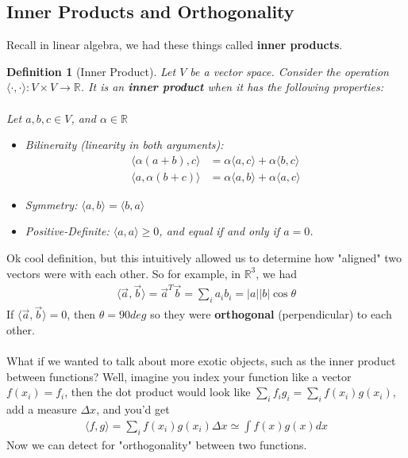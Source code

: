 \documentclass[12pt,fleqn]{article}
\numberwithin{equation}{section} %
\newtheorem{definition}{Definition}
\begin{document}
\subsection{Inner Products and Orthogonality}
Recall in linear algebra, we had these things called \textbf{inner products}. 
\begin{definition}
	[Inner Product] Let $V$ be a vector space. Consider the operation $\langle \cdot, \cdot \rangle : V \times V \to \mathbb R$. It is an \textbf{inner product} when it has the following properties:
	\\
	\\
	Let $a,b,c \in V$, and $\alpha \in \mathbb R$
	\begin{itemize}
		\item Bilineraity (linearity in both arguments): 
		\begin{align}
			\langle \alpha (a + b) , c\rangle & = \alpha \langle a, c\rangle  + \alpha \langle b , c\rangle\\
			\langle a, \alpha (b + c)\rangle &  = \alpha \langle a, b\rangle + \alpha \langle a, c\rangle
		\end{align}  
		\item Symmetry: $\langle a, b\rangle = \langle b, a\rangle$
		\item Positive-Definite: $\langle a, a\rangle \geq 0$, and equal if and only if $a=0$.
	\end{itemize}
\end{definition}
Ok cool definition, but this intuitively allowed us to determine how "aligned" two vectors were with each other. So for example, in $\mathbb R^3$, we had
\begin{align}
	\langle \vec a, \vec b\rangle = \vec a^T \vec b =  \sum_i a_i b_i =|a||b| \cos \theta
\end{align}
If $\langle \vec a , \vec b\rangle = 0$, then $\theta = 90 deg$ so they were \textbf{orthogonal} (perpendicular) to each other.\\
\\
What if we wanted to talk about more exotic objects, such as the inner product between functions? Well, imagine you index your function like a vector $f(x_i) = f_i$, then the dot product would look like $\sum_i f_i g_i = \sum_i f(x_i ) g(x_i)$, add a measure $\Delta x$, and you'd get
\begin{align}
	\langle f, g\rangle = \sum_i f(x_i) g(x_i) \Delta x \simeq \int f(x) g(x) dx
\end{align}
Now we can detect for "orthogonality" between two functions. 
\end{document}
